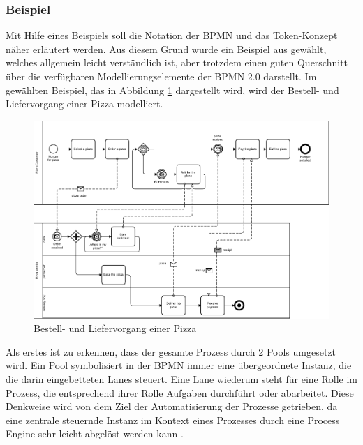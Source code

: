 \documentclass[a4paper,12pt]{report}
\begin{document}
\subsubsection{Beispiel}\label{subsubsec:BPMNBeispiel}
Mit Hilfe eines Beispiels soll die Notation der BPMN und das Token-Konzept näher erläutert werden. Aus diesem Grund wurde ein Beispiel aus \citep{OMG2010} gewählt, welches allgemein leicht verständlich ist, aber trotzdem einen guten Querschnitt über die verfügbaren Modellierungselemente der BPMN 2.0 darstellt. Im gewählten Beispiel, das in Abbildung \ref{bpmn_pizza_collaboration} dargestellt wird, wird der Bestell- und Liefervorgang einer Pizza modelliert.
\begin{figure}[ht]
\centering
\includegraphics[width=1\textwidth]{Images/pizza_collaboration}
\caption[Bestell- und Liefervorgang einer Pizza]{Bestell- und Liefervorgang einer Pizza \citep[S. 4]{OMG2010}}
\label{bpmn_pizza_collaboration}
\end{figure}

Als erstes ist zu erkennen, dass der gesamte Prozess durch 2 Pools umgesetzt wird. Ein Pool symbolisiert in der BPMN immer eine übergeordnete Instanz, die die darin eingebetteten Lanes steuert. Eine Lane wiederum steht für eine Rolle im Prozess, die entsprechend ihrer Rolle Aufgaben durchführt oder abarbeitet. Diese Denkweise wird von dem Ziel der Automatisierung der Prozesse getrieben, da eine zentrale steuernde Instanz im Kontext eines Prozesses durch eine Process Engine sehr leicht abgelöst werden kann \citep[vgl.][S. 96ff.]{Freund2014}.
\end{document}
